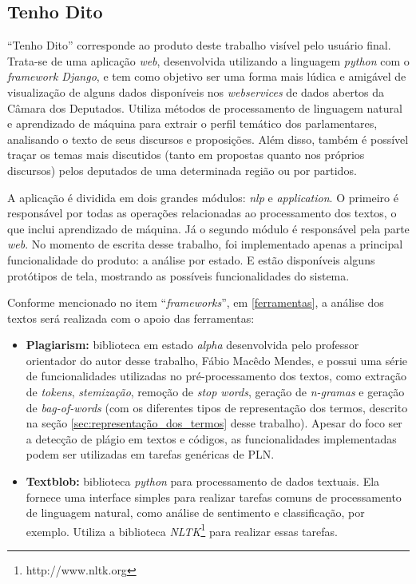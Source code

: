 \clearpage

\subsection{Tenho Dito}

``Tenho Dito'' corresponde ao produto deste trabalho visível pelo usuário final. Trata-se de uma aplicação \textit{web}, desenvolvida utilizando a linguagem \textit{python} com o \textit{framework Django}, e tem como objetivo ser uma forma mais lúdica e amigável de visualização de alguns dados disponíveis nos \textit{webservices} de dados abertos da Câmara dos Deputados. Utiliza métodos de processamento de linguagem natural e aprendizado de máquina para extrair o perfil temático dos parlamentares, analisando o texto de seus discursos e proposições. Além disso, também é possível traçar os temas mais discutidos (tanto em propostas quanto nos próprios discursos) pelos deputados de uma determinada região ou por partidos.

A aplicação é dividida em dois grandes módulos: \textit{nlp} e \textit{application}. O primeiro é responsável por todas as operações relacionadas ao processamento dos textos, o que inclui aprendizado de máquina. Já o segundo módulo é responsável pela parte \textit{web}. No momento de escrita desse trabalho, foi implementado apenas a principal funcionalidade do produto: a análise por estado. E estão disponíveis alguns protótipos de tela, mostrando as possíveis funcionalidades do sistema.

Conforme mencionado no item ``\textit{frameworks}'', em \ref{ferramentas}, a análise dos textos será realizada com o apoio das ferramentas:

\begin{itemize}
    \item \textbf{Plagiarism:} biblioteca em estado \textit{alpha} desenvolvida pelo professor orientador do autor desse trabalho, Fábio Macêdo Mendes, e possui uma série de funcionalidades utilizadas no pré-processamento dos textos, como extração de \textit{tokens}, \textit{stemização}, remoção de \textit{stop words}, geração de \textit{n-gramas} e geração de \textit{bag-of-words} (com os diferentes tipos de representação dos termos, descrito na seção \ref{sec:representação_dos_termos} desse trabalho). Apesar do foco ser a detecção de plágio em textos e códigos, as funcionalidades implementadas podem ser utilizadas em tarefas genéricas de PLN.
    \item \textbf{Textblob:} biblioteca \textit{python} para processamento de dados textuais. Ela fornece uma interface simples para realizar tarefas comuns de processamento de linguagem natural, como análise de sentimento e classificação, por exemplo. Utiliza a biblioteca \textit{NLTK}\footnote{http://www.nltk.org} para realizar essas tarefas.
\end{itemize}

